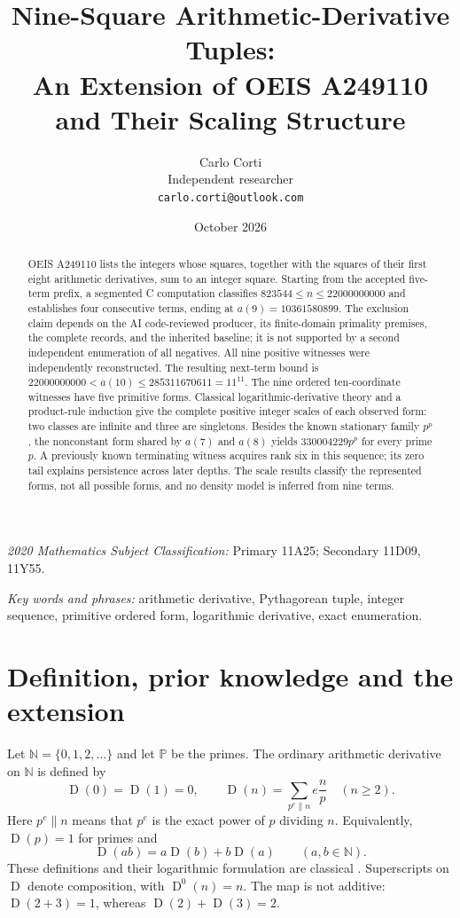 \documentclass[11pt]{article}
\title{Nine-Square Arithmetic-Derivative Tuples:\\An Extension of OEIS A249110 and Their Scaling Structure}
\author{Carlo Corti\\Independent researcher\\\texttt{carlo.corti@outlook.com}}
\date{October 2026}
\newcommand{\D}{\operatorname{D}}
\newcommand{\NN}{\mathbb{N}}
\newcommand{\PP}{\mathbb{P}}
\theoremstyle{definition}
\theoremstyle{remark}
\begin{document}
\maketitle

\begin{abstract}
OEIS A249110 lists the integers whose squares, together with the squares
of their first eight arithmetic derivatives, sum to an integer square.
Starting from the accepted five-term prefix, a segmented C computation
classifies $823544\le n\le22000000000$ and establishes four consecutive
terms, ending at $a(9)=10361580899$. The exclusion claim depends on the
AI code-reviewed producer, its finite-domain primality premises, the complete
records, and the inherited baseline; it is not supported by a second
independent enumeration of all negatives. All nine positive witnesses
were independently reconstructed. The resulting next-term bound is
$22000000000<a(10)\le285311670611=11^{11}$.
The nine ordered ten-coordinate witnesses have five primitive forms.
Classical logarithmic-derivative theory and a product-rule induction
give the complete positive integer scales of each observed form:
two classes are infinite and three are singletons. Besides the known
stationary family $p^p$, the nonconstant form shared by $a(7)$ and
$a(8)$ yields $330004229p^p$ for every prime $p$.
A previously known terminating witness acquires rank six in this
sequence; its zero tail explains persistence across later depths.
The scale results classify the represented forms, not all possible
forms, and no density model is inferred from nine terms.
\end{abstract}

\noindent\textit{2020 Mathematics Subject Classification:}
Primary 11A25; Secondary 11D09, 11Y55.

\noindent\textit{Key words and phrases:}
arithmetic derivative, Pythagorean tuple, integer sequence, primitive
ordered form, logarithmic derivative, exact enumeration.

\section{Definition, prior knowledge and the extension}\label{sec:intro}

Let $\NN=\{0,1,2,\ldots\}$ and let $\PP$ be the primes. The ordinary
arithmetic derivative on $\NN$ is defined by
\begin{equation}\label{eq:derivative}
 \D(0)=\D(1)=0,\qquad
 \D(n)=\sum_{p^e\parallel n}e\frac{n}{p}\quad(n\ge2).
\end{equation}
Here $p^e\parallel n$ means that $p^e$ is the exact power of $p$ dividing
$n$. Equivalently, $\D(p)=1$ for primes and
\begin{equation}\label{eq:product}
 \D(ab)=a\D(b)+b\D(a)\qquad(a,b\in\NN).
\end{equation}
These definitions and their logarithmic formulation are classical
\cite{barbeau,ufnarovski,kovic}. Superscripts on $\D$ denote composition,
with $\D^0(n)=n$. The map is not additive: $\D(2+3)=1$, whereas
$\D(2)+\D(3)=2$.
\end{document}
